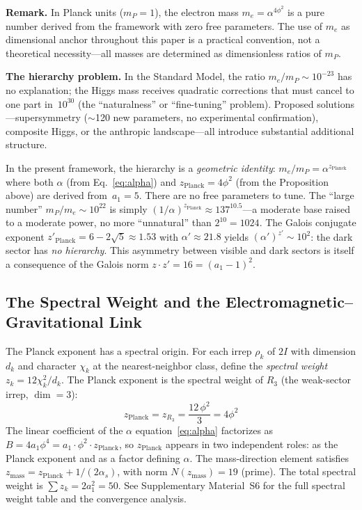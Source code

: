 \documentclass[12pt,a4paper]{article}
\theoremstyle{definition}
\begin{document}
\textbf{Remark.}  In Planck units ($m_P = 1$), the electron mass $m_e = \alpha^{4\phi^2}$ is a pure number derived from the framework with zero free parameters.  The use of $m_e$ as dimensional anchor throughout this paper is a practical convention, not a theoretical necessity---all masses are determined as dimensionless ratios of $m_P$.

\textbf{The hierarchy problem.}  In the Standard Model, the ratio $m_e/m_P \sim 10^{-23}$ has no explanation; the Higgs mass receives quadratic corrections that must cancel to one part in~$10^{30}$ (the ``naturalness'' or ``fine-tuning'' problem).  Proposed solutions---supersymmetry ($\sim$120 new parameters, no experimental confirmation), composite Higgs, or the anthropic landscape---all introduce substantial additional structure.

In the present framework, the hierarchy is a \emph{geometric identity}: $m_e/m_P = \alpha^{z_{\text{Planck}}}$ where both $\alpha$ (from Eq.~\ref{eq:alpha}) and $z_{\text{Planck}} = 4\phi^2$ (from the Proposition above) are derived from~$a_1 = 5$.  There are no free parameters to tune.  The ``large number'' $m_P/m_e \sim 10^{22}$ is simply $(1/\alpha)^{z_{\text{Planck}}} \approx 137^{10.5}$---a moderate base raised to a moderate power, no more ``unnatural'' than $2^{10} = 1024$.  The Galois conjugate exponent $z'_{\text{Planck}} = 6 - 2\sqrt{5} \approx 1.53$ with $\alpha' \approx 21.8$ yields $(\alpha')^{z'} \sim 10^2$: the dark sector has \emph{no hierarchy}.  This asymmetry between visible and dark sectors is itself a consequence of the Galois norm $z \cdot z' = 16 = (a_1 - 1)^2$.

\subsection{The Spectral Weight and the Electromagnetic--Gravitational Link}
\label{sec:spectral_weight}

The Planck exponent has a spectral origin.  For each irrep $\rho_k$ of $2I$ with dimension $d_k$ and character $\chi_k$ at the nearest-neighbor class, define the \emph{spectral weight} $z_k = 12\chi_k^2/d_k$.  The Planck exponent is the spectral weight of $R_3$ (the weak-sector irrep, $\dim = 3$):
\begin{equation}
\boxed{z_{\text{Planck}} = z_{R_3} = \frac{12\,\phi^2}{3} = 4\phi^2}
\label{eq:zP_spectral}
\end{equation}
The linear coefficient of the $\alpha$ equation~\eqref{eq:alpha} factorizes as $B = 4a_1\phi^4 = a_1 \cdot \phi^2 \cdot z_{\text{Planck}}$, so $z_{\text{Planck}}$ appears in two independent roles: as the Planck exponent and as a factor defining $\alpha$.  The mass-direction element satisfies $z_{\text{mass}} = z_{\text{Planck}} + 1/(2\alpha_s)$, with norm $N(z_{\text{mass}}) = 19$ (prime).  The total spectral weight is $\sum z_k = 2a_1^2 = 50$.  See Supplementary Material~S6 for the full spectral weight table and the convergence analysis.
\end{document}
